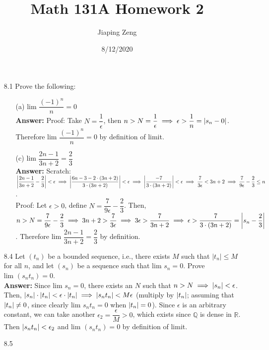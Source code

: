 \documentclass{article}
\title{Math 131A Homework 2}
\date{8/12/2020}
\author{Jiaping Zeng}
\begin{document}
\maketitle

\begin{itemize}
      \item [8.1] Prove the following:
            \begin{itemize}
                  \item [(a)] $\text{lim }\dfrac{(-1)^n}{n}=0$\\
                        \textbf{Answer: } Proof: Take $N=\dfrac{1}{\epsilon}$, then $n>N=\dfrac{1}{\epsilon}\implies\epsilon>\dfrac{1}{n}=\abs{s_n-0}$. Therefore $\text{lim }\dfrac{(-1)^n}{n}=0$ by definition of limit.
                  \item [(c)] $\text{lim }\dfrac{2n-1}{3n+2}=\dfrac{2}{3}$\\
                        \textbf{Answer: }
                        Scratch: $\abs{\dfrac{2n-1}{3n+2}-\dfrac{2}{3}}<\epsilon\implies\abs{\dfrac{6n-3-2\cdot(3n+2)}{3\cdot(3n+2)}}<\epsilon\implies\abs{\dfrac{-7}{3\cdot(3n+2)}}<\epsilon\implies\dfrac{7}{3\epsilon}<3n+2\implies\dfrac{7}{9\epsilon}-\dfrac{2}{3}\leq n$.\\
                        Proof: Let $\epsilon>0$, define $N=\dfrac{7}{9\epsilon}-\dfrac{2}{3}$. Then, $n>N=\dfrac{7}{9\epsilon}-\dfrac{2}{3}\implies 3n+2>\dfrac{7}{3\epsilon}\implies 3\epsilon>\dfrac{7}{3n+2}\implies\epsilon>\dfrac{7}{3\cdot(3n+2)}=\abs{s_n-\dfrac{2}{3}}$. Therefore $\text{lim }\dfrac{2n-1}{3n+2}=\dfrac{2}{3}$ by definition.
            \end{itemize}
      \item [8.4] Let $(t_n)$ be a bounded sequence, i.e., there exists $M$ such that $|t_n|\leq M$ for all $n$, and let $(s_n)$ be a sequence such that $\text{lim }s_n=0$. Prove $\text{lim }(s_nt_n)=0$.\\
            \textbf{Answer: } Since $\text{lim }s_n=0$, there exists an $N$ such that $n>N\implies\abs{s_n}<\epsilon$. Then, $\abs{s_n}\cdot\abs{t_n}<\epsilon\cdot\abs{t_n}\implies\abs{s_nt_n}<M\epsilon$ (multiply by $\abs{t_n}$; assuming that $\abs{t_n}\neq 0$, since clearly $\text{lim }s_nt_n=0$ when $\abs{t_n}=0$). Since $\epsilon$ is an arbitrary constant, we can take another $\epsilon_2=\dfrac{\epsilon}{M}>0$, which exists since $\mathbb{Q}$ is dense in $\mathbb{R}$. Then $\abs{s_nt_n}<\epsilon_2$ and $\text{lim }(s_nt_n)=0$ by definition of limit.
      \item [8.5]

\end{itemize}
\end{document}
